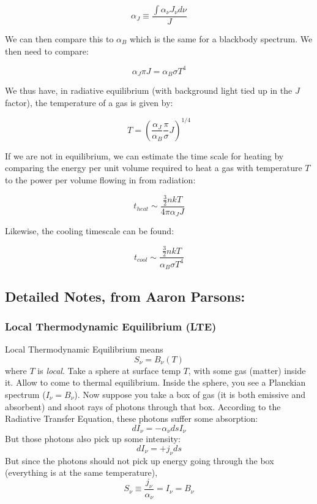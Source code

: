 \documentclass{article}
\begin{document}
\begin{equation}
    \alpha_J \equiv \frac{\int \alpha_\nu J_\nu d\nu}{J}
\end{equation}

We can then compare this to $\alpha_B$ which is the same for a blackbody spectrum. We then need to compare:

\begin{equation}
    \boxed{\alpha_J \pi J = \alpha_B \sigma T^4}
\end{equation}

We thus have, in radiative equilibrium (with background light tied up in the $J$ factor), the temperature of a gas is given by:

\begin{equation}
    \boxed{T = \left(\frac{\alpha_J}{\alpha_B} \frac{\pi}{\sigma} J\right)^{1/4}}
\end{equation}

If we are not in equilibrium, we can estimate the time scale for heating by comparing the energy per unit volume required to heat a gas with temperature $T$ to the power per volume flowing in from radiation:

\begin{equation}
    \boxed{t_{heat} \sim \frac{\frac{3}{2} n k T}{4\pi \alpha_J J}}
\end{equation}

Likewise, the cooling timescale can be found:

\begin{equation}
    \boxed{t_{cool} \sim \frac{\frac{3}{2} n k T}{\alpha_B \sigma T^4}}
\end{equation}

\subsection{Detailed Notes, from Aaron Parsons:}

\subsubsection{ Local Thermodynamic Equilibrium (LTE)}

Local Thermodynamic Equilibrium means 
$$S_\nu=B_\nu(T)$$
where $T$ is {\it local}.
Take a sphere at surface temp $T$, with some gas (matter) inside it.   Allow
to come to thermal equilibrium.  Inside the sphere, 
you see a Planckian spectrum ($I_\nu = B_\nu$).  Now suppose you take a box of
gas (it is both emissive and absorbent) and shoot rays of photons through
that box. According to the Radiative Transfer Equation, these photons suffer some absorption: 
$$dI_\nu = -\alpha _\nu ds I_\nu$$
But
those photons also pick up some intensity: 
$$dI_\nu = +j_\nu ds$$
But since the photons
should not pick up energy going through the box (everything is at the same
temperature), 
$$S_\nu\equiv\frac{j_\nu}{\alpha_\nu}=I_\nu=B_\nu$$
\end{document}
